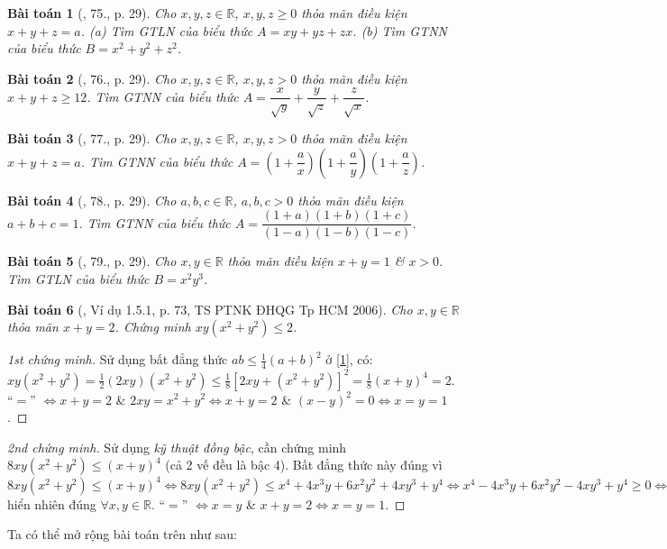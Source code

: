 \documentclass{article}
\newtheorem{baitoan}{Bài toán}
\begin{document}
\begin{baitoan}[\cite{Tuyen_Toan_9}, 75., p. 29]
	Cho $x,y,z\in\mathbb{R}$, $x,y,z\ge0$ thỏa mãn điều kiện $x + y + z = a$. (a) Tìm {\rm GTLN} của biểu thức $A = xy + yz + zx$. (b) Tìm {\rm GTNN} của biểu thức $B = x^2 + y^2 + z^2$.
\end{baitoan}

\begin{baitoan}[\cite{Tuyen_Toan_9}, 76., p. 29]
	Cho $x,y,z\in\mathbb{R}$, $x,y,z > 0$ thỏa mãn điều kiện $x + y + z\ge12$. Tìm {\rm GTNN} của biểu thức $A = \dfrac{x}{\sqrt{y}} + \dfrac{y}{\sqrt{z}} + \dfrac{z}{\sqrt{x}}$.
\end{baitoan}

\begin{baitoan}[\cite{Tuyen_Toan_9}, 77., p. 29]
	Cho $x,y,z\in\mathbb{R}$, $x,y,z > 0$ thỏa mãn điều kiện $x + y + z = a$. Tìm {\rm GTNN} của biểu thức $A = \left(1 + \dfrac{a}{x}\right)\left(1 + \dfrac{a}{y}\right)\left(1 + \dfrac{a}{z}\right)$.
\end{baitoan}

\begin{baitoan}[\cite{Tuyen_Toan_9}, 78., p. 29]
	Cho $a,b,c\in\mathbb{R}$, $a,b,c > 0$ thỏa mãn điều kiện $a + b + c = 1$. Tìm {\rm GTNN} của biểu thức $A = \dfrac{(1 + a)(1 + b)(1 + c)}{(1 - a)(1 - b)(1 - c)}$.
\end{baitoan}

\begin{baitoan}[\cite{Tuyen_Toan_9}, 79., p. 29]
	Cho $x,y\in\mathbb{R}$ thỏa mãn điều kiện $x + y = 1$ \& $x > 0$. Tìm {\rm GTLN} của biểu thức $B = x^2y^3$.
\end{baitoan}

\begin{baitoan}[\cite{Dung_Can_Anh_BDT_8_9}, Ví dụ 1.5.1, p. 73, TS PTNK ĐHQG Tp HCM 2006]
	Cho $x,y\in\mathbb{R}$ thỏa mãn $x + y = 2$. Chứng minh $xy(x^2 + y^2)\le2$.
\end{baitoan}

\begin{proof}[1st chứng minh]
	Sử dụng bất đẳng thức $ab\le\frac{1}{4}(a + b)^2$ ở \eqref{1}, có: $xy(x^2 + y^2) = \frac{1}{2}(2xy)(x^2 + y^2)\le\frac{1}{8}[2xy + (x^2 + y^2)]^2 = \frac{1}{8}(x + y)^4 = 2$. ``$=$'' $\Leftrightarrow x + y = 2$ \& $2xy = x^2 + y^2\Leftrightarrow x + y = 2$ \& $(x - y)^2 = 0\Leftrightarrow x = y = 1$.
\end{proof}

\begin{proof}[2nd chứng minh]
	Sử dụng \textit{kỹ thuật đồng bậc}, cần chứng minh $8xy(x^2 + y^2)\le(x + y)^4$ (cả 2 vế đều là bậc 4). Bất đẳng thức này đúng vì $8xy(x^2 + y^2)\le(x + y)^4\Leftrightarrow8xy(x^2 + y^2)\le x^4 + 4x^3y + 6x^2y^2 + 4xy^3 + y^4\Leftrightarrow x^4 - 4x^3y + 6x^2y^2 - 4xy^3 + y^4\ge0\Leftrightarrow(x - y)^4\ge0$ hiển nhiên đúng $\forall x,y\in\mathbb{R}$. ``$=$'' $\Leftrightarrow x = y$ \& $x + y = 2\Leftrightarrow x = y = 1$.
\end{proof}
Ta có thể mở rộng bài toán trên như sau:
\end{document}
